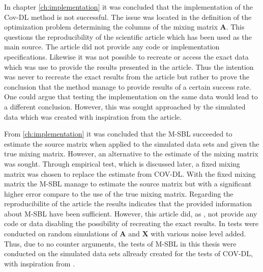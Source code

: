 In chapter \ref{ch:implementation} it was concluded that the implementation of the Cov-DL method is not successful.
The issue was located in the definition of the optimization problem determining the columns of the mixing matrix $\mathbf{A}$.  
This questions the reproducibility of the scientific article \cite{Cov} which has been used as the main source. 
The article \cite{cov} did not provide any code or implementation specifications. 
Likewise it was not possible to recreate or access the exact data which was use to provide the results presented in the article. 
Thus the intention was never to recreate the exact results from the article but rather to prove the conclusion that the method manage to provide results of a certain success rate.    
One could argue that testing the implementation on the same data would lead to a different conclusion. 
However, this was sought approached by the simulated data which was created with inspiration from the article.

From \ref{ch:implementation} it was concluded that the M-SBL succeeded to estimate the source matrix when applied to the simulated data sets and given the true mixing matrix. 
However, an alternative to the estimate of the mixing matrix was sought. 
Through empirical test, which is discussed later, a fixed mixing matrix was chosen to replace the estimate from COV-DL. 
With the fixed mixing matrix the M-SBL manage to estimate the source matrix but with a significant higher error compare to the use of the true mixing matrix.
Regarding the reproducibilite of the article \cite{M-SBL} the results indicates that the provided information about M-SBL have been sufficient.
However, this article did, as \cite{Cov}, not provide any code or data disabling the possibility of recreating the exact results. In \cite{M-SBL} tests were conducted on random simulations of $\textbf{A}$ and $\textbf{X}$ with various noise level added.   
Thus, due to no counter arguments, the tests of M-SBL in this thesis were conducted on the simulated data sets allready created for the tests of COV-DL, with inspiration from \cite{Cov}.

